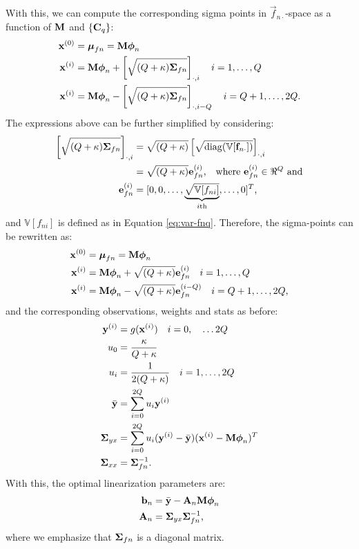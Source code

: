 \documentclass[11pt,a4paper]{article}
\newcommand{\x}{\vec{x}}
\newcommand{\y}{\vec{y}}
\renewcommand{\xi}{\x^{(i)}}
\newcommand{\yi}{\y^{(i)}}
\newcommand{\ybar}{\bar{\y}}
\newcommand{\Sigmaxx}{\mat{\Sigma}_{xx}}
\newcommand{\Sigmayx}{\mat{\Sigma}_{yx}}
\newcommand{\w}{u}
\newcommand{\wi}{u_i}
\newcommand{\wo}{\w_0}
\newcommand{\xo}{\x^{(0)}}
\renewcommand{\Q}{Q}
\renewcommand{\k}{\kappa}
\newcommand{\mathcol}[2]{  \left[#1\right]_{\cdot, #2} }
\newcommand{\f}{\vec{f}}
\newcommand{\fn}{\f_{n \cdot}}
\newcommand{\An}{\mat{A}_n}
\newcommand{\bn}{\vec{b}_n}
\newcommand{\phin}{\vecS{\phi}_n}
\newcommand{\mufn}{\vecS{\mu}_{fn}}
\newcommand{\Sigmafn}{\mat{\Sigma}_{fn}}
\newcommand{\M}{\mat{M}}
\newcommand{\fni}{f_{ni}}
\newcommand{\var}[1]{\mathbb{V}[#1]}
\newcommand{\sigmafn}[1]{\vec{e}_{fn}^{(#1)}}
\begin{document}
With this, we can compute the corresponding sigma points in $\fn$-space  as a function of 
$\M$ and $\{ \mathbf{C}_q \}$:
\begin{align}
	\xo & = \mufn = \M \phin \\
	\xi & = \M \phin  + \mathcol{\sqrt{ (\Q + \k) \Sigmafn}}{i} \quad i=1, \ldots, \Q \\
	\xi & = \M \phin  - \mathcol{\sqrt{ (\Q + \k) \Sigmafn}}{i-Q} \quad i=Q+1, \ldots, 2\Q 	\text{.}
\end{align}
The expressions above can be further simplified by considering:
\begin{align}
	\mathcol{\sqrt{ (\Q + \k) \Sigmafn}}{i} &= \sqrt{ (\Q + \k)} \mathcol{\sqrt{\diag (\var{\fn})} }{i} \\
	&=  \sqrt{ (\Q + \k)}  \sigmafn{i} \text{,} \quad \text{where }  \sigmafn{i} \in \Re^\Q \text{ and} \\
	\sigmafn{i} &= [0, 0, \ldots, \underbrace{\sqrt{\var{\fni}}}_{i\mth}, \ldots, 0 ]^T \text{,}
\end{align}
and $\var{\fni}$ is defined as in Equation \eqref{eq:var-fnq}. Therefore, the sigma-points can 
be rewritten as:
\begin{align}
\xo & = \mufn = \M \phin \\
	\xi & = \M \phin +  \sqrt{ (\Q + \k)}  \sigmafn{i} \quad i=1, \ldots, \Q \\
	\xi & = \M \phin - \sqrt{ (\Q + \k)}  \sigmafn{i-Q} \quad i=Q+1, \ldots, 2\Q \text{,}
\end{align}
 and the corresponding observations, weights and stats as before:
 \begin{align}
	\yi & = g(\xi) \quad i = 0, \quad \ldots 2\Q\\
	\wo &= \frac{\k}{\Q + \k} \\
	\wi &= \frac{1}{2(\Q + \k)}  \quad  i = 1, \ldots, 2\Q  \\
	\ybar  &=  \sum_{i=0}^{2 \Q} \wi \yi 	\\
	\Sigmayx  &= \sum_{i=0}^{2\Q} \wi (\yi - \ybar) (\xi - \M \phin)^T \\
	\Sigmaxx &= \Sigmafn^{-1} \text{.}
\end{align}
With this, the optimal linearization parameters are:
\begin{align}
	\bn & = \ybar - \An \M \phin \\
	\An &= \Sigmayx \Sigmafn^{-1} \text{,}
\end{align}
where we emphasize that  $\Sigmafn$ is a diagonal matrix.
\end{document}
